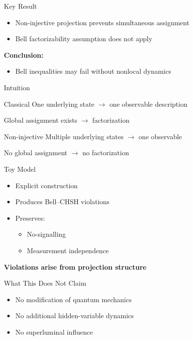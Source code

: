 \documentclass{beamer}
\begin{document}
  \begin{frame}{Key Result}
    \begin{itemize}
      \item Non-injective projection prevents simultaneous assignment
      \item Bell factorizability assumption does not apply
    \end{itemize}

    \medskip

    \textbf{Conclusion:}
    \begin{itemize}
      \item Bell inequalities may fail without nonlocal dynamics
    \end{itemize}
  \end{frame}

  \begin{frame}{Intuition}
    \begin{block}{Classical}
      One underlying state $\rightarrow$ one observable description

      Global assignment exists $\rightarrow$ factorization
    \end{block}

    \begin{block}{Non-injective}
      Multiple underlying states $\rightarrow$ one observable

      No global assignment $\rightarrow$ no factorization
    \end{block}
  \end{frame}

  \begin{frame}{Toy Model}
    \begin{itemize}
      \item Explicit construction
      \item Produces Bell--CHSH violations
      \item Preserves:
      \begin{itemize}
        \item No-signalling
        \item Measurement independence
      \end{itemize}
    \end{itemize}

    \medskip

    \textbf{Violations arise from projection structure}
  \end{frame}

  \begin{frame}{What This Does Not Claim}
    \begin{itemize}
      \item No modification of quantum mechanics
      \item No additional hidden-variable dynamics
      \item No superluminal influence
    \end{itemize}
  \end{frame}
\end{document}
